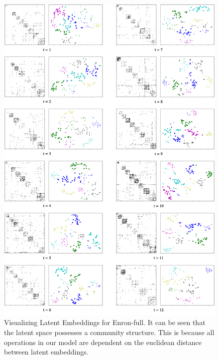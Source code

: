 \documentclass[letterpaper]{article} %
\begin{document}
\begin{figure}
\vskip 0.2in
\begin{center}
\centering
\includegraphics[scale=0.50]{enron_clustering}
\caption{Visualizing Latent Embeddings for Enron-full. It can be seen that the latent space possesses a community structure. This is because all operations in our model are dependent on the euclidean distance between latent embeddings.}
\label{fig:enron_clustering}
\end{center}
\vskip -0.2in
\end{figure}
\end{document}
